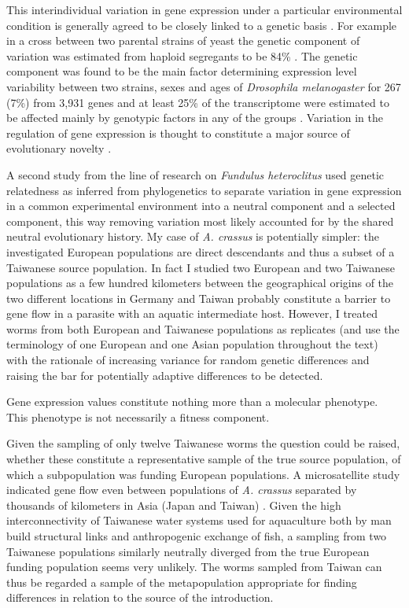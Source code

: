 This interindividual variation in gene expression under a particular
environmental condition is generally agreed to be closely linked to a
genetic basis \cite{pmid15498452}. For example in a cross between two
parental strains of yeast the genetic component of variation was
estimated from haploid segregants to be 84\% \cite{pmid11923494}. The
genetic component was found to be the main factor determining
expression level variability between two strains, sexes and ages of
\textit{Drosophila melanogaster} for 267 (7\%) from 3,931 genes and at
least 25\% of the transcriptome were estimated to be affected mainly
by genotypic factors in any of the groups
\cite{pmid11726925}. Variation in the regulation of gene expression is
thought to constitute a major source of evolutionary novelty
\cite{pmid11341673}.

A second study from the line of research on \textit{Fundulus
  heteroclitus} \cite{pmid16567645} used genetic relatedness as
inferred from phylogenetics to separate variation in gene expression
in a common experimental environment into a neutral component and a
selected component, this way removing variation most likely accounted
for by the shared neutral evolutionary history. My case of
\textit{A. crassus} is potentially simpler: the investigated European
populations are direct descendants and thus a subset of a Taiwanese
source population. In fact I studied two European and two Taiwanese
populations as a few hundred kilometers between the geographical
origins of the two different locations in Germany and Taiwan probably
constitute a barrier to gene flow in a parasite with an aquatic
intermediate host. However, I treated worms from both European and
Taiwanese populations as replicates (and use the terminology of one
European and one Asian population throughout the text) with the
rationale of increasing variance for random genetic differences and
raising the bar for potentially adaptive differences to be detected.


Gene expression values constitute nothing more than a molecular
phenotype. This phenotype is not necessarily a fitness component.


Given the sampling of only twelve Taiwanese worms the question could
be raised, whether these constitute a representative sample of the
true source population, of which a subpopulation was funding European
populations. A microsatellite study indicated gene flow even between
populations of \textit{A. crassus} separated by thousands of
kilometers in Asia (Japan and Taiwan)
\cite{wielgoss_population_2008}. Given the high interconnectivity of
Taiwanese water systems used for aquaculture both by man build
structural links and anthropogenic exchange of fish, a sampling from
two Taiwanese populations similarly neutrally diverged from the true
European funding population seems very unlikely. The worms sampled
from Taiwan can thus be regarded a sample of the metapopulation
appropriate for finding differences in relation to the source of the
introduction.

